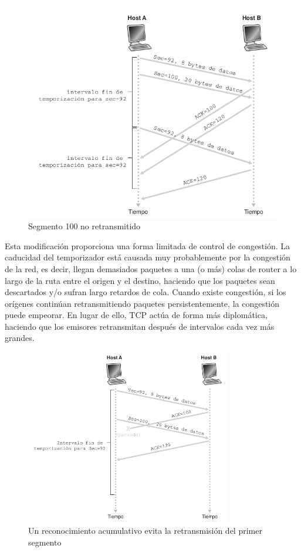 \documentclass[a4paper,11pt]{article}
\begin{document}
\begin{figure}[h]
\centering
\caption{Segmento 100 no retransmitido}
\includegraphics[scale=1,width=1\textwidth]{ejemplo_2.png}
\end{figure}

Esta modificación proporciona una forma limitada de control de congestión. La caducidad del temporizador está causada muy probablemente por la congestión de la red, es decir, llegan demasiados paquetes a una (o más) colas de router a lo largo de la ruta entre el origen y el destino, haciendo que los paquetes sean descartados y/o sufran largo retardos de cola. Cuando existe congestión, si los orígenes continúan retransmitiendo paquetes persistentemente, la congestión puede empeorar. En lugar de ello, TCP actúa de forma más diplomática, haciendo que los emisores retransmitan después de intervalos cada vez más grandes. \\

\begin{figure}[h]
\centering
\caption{Un reconocimiento acumulativo evita la retransmisión del primer segmento}
\includegraphics[scale=1,width=0.8\textwidth]{ejemplo_3.png}
\end{figure}
\end{document}
